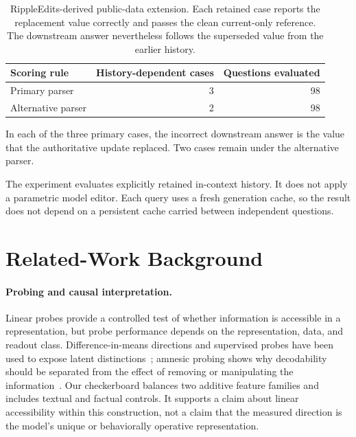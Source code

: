 \documentclass{article}
\begin{document}
\begin{table}[htbp]
\caption{RippleEdits-derived public-data extension.
Each retained case reports the replacement value correctly and passes the
clean current-only reference. The downstream answer nevertheless follows the
superseded value from the earlier history.}
\label{tab:ripple-extension}

\centering
\small
\begin{tabular}{lrr}
\toprule
Scoring rule & History-dependent cases & Questions evaluated \\
\midrule
Primary parser & 3 & 98 \\
Alternative parser & 2 & 98 \\
\bottomrule
\end{tabular}


\end{table}

In each of the three primary cases, the incorrect downstream answer is the
value that the authoritative update replaced. Two cases remain under the
alternative parser.

The experiment evaluates explicitly retained in-context history. It does not
apply a parametric model editor. Each query uses a fresh generation cache, so
the result does not depend on a persistent cache carried between independent
questions.


\section{Related-Work Background}
\label{app:related-work-background}

\paragraph{Probing and causal interpretation.} Linear probes provide a controlled test of whether information is accessible in a representation, but probe performance depends on the representation, data, and readout class. Difference-in-means directions and supervised probes have been used to expose latent distinctions~\citep{burns2023discovering}; amnesic probing shows why decodability should be separated from the effect of removing or manipulating the information~\citep{elazar2021amnesic}. Our checkerboard balances two additive feature families and includes textual and factual controls. It supports a claim about linear accessibility within this construction, not a claim that the measured direction is the model's unique or behaviorally operative representation.
\end{document}
